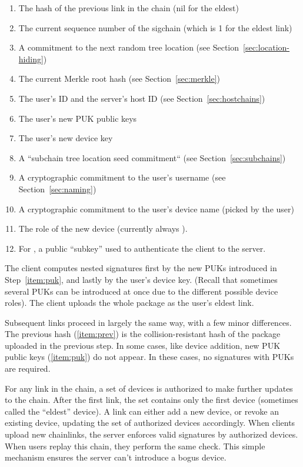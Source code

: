 \begin{enumerate}[label=U.\arabic*]\itemsep0em
    \item \label{item:prev} The hash of the previous link in the chain (nil for the eldest)
    \item The current sequence number of the sigchain (which is 1 for the eldest link)
    \item A commitment to the next random tree location (see Section~\ref{sec:location-hiding})
      \label{item:next-tree-location}
    \item The current Merkle root hash (see Section~\ref{sec:merkle})
    \item The user's ID and the server's host ID (see Section~\ref{sec:hostchains})
    \item \label{item:puk} The user's new PUK public keys
    \item The user's new device key
    \item A ``subchain tree location seed commitment`` (see Section~\ref{sec:subchains})
      \label{item:stlsc}
    \item A cryptographic commitment to the user's username (see Section~\ref{sec:naming})
       \label{item:name}
    \item A cryptographic commitment to the user's device name (picked by the user)
    \item The role of the new device (currently always \owner ).
    \item For \yubis , a public ``subkey'' used to authenticate the client
      to the server.
\end{enumerate}

The client computes nested signatures first by the new PUKs introduced in
Step~\ref{item:puk}, and lastly by the user's device key. (Recall that sometimes
several PUKs can be introduced at once due to the different possible device
roles). The client uploads the whole package as the user's eldest link.

Subsequent links proceed in largely the same way, with a few minor differences.
The previous hash (\ref{item:prev}) is the collision-resistant hash of the 
package uploaded in the previous step. In some cases, like device addition,
new PUK public keys (\ref{item:puk}) do not appear. In these cases,
no signatures with PUKs are required.

For any link in the chain, a set of devices is authorized to make further
updates to the chain. After the first link, the set contains only the first
device (sometimes called the ``eldest'' device). A link can either add a new
device, or revoke an existing device, updating the set of authorized devices
accordingly. When clients upload new chainlinks, the server enforces valid
signatures by authorized devices. When users replay this chain, they perform the
same check. This simple mechanism ensures the server can't introduce a bogus
device.

